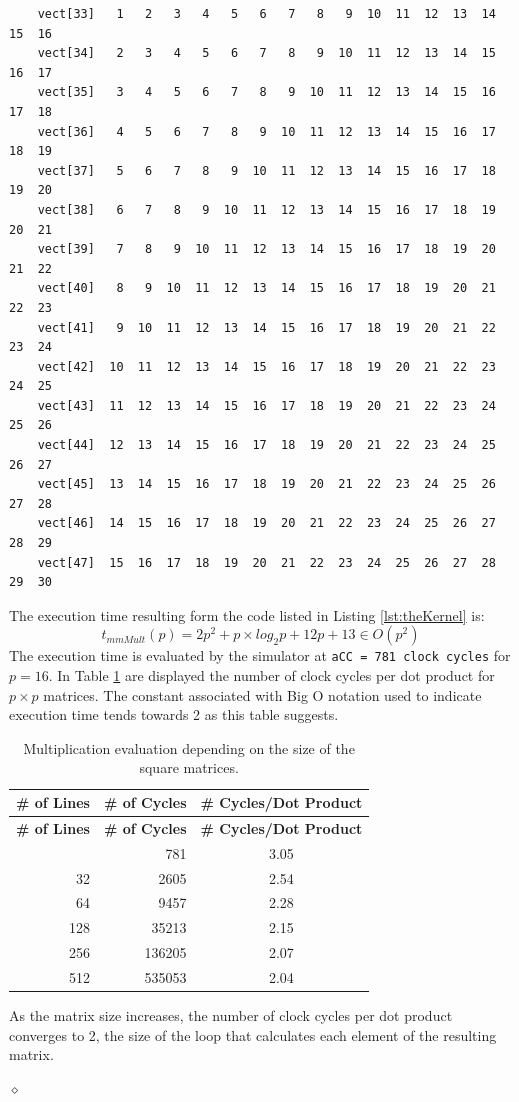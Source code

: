 \begin{exemplu}
{\begin{verbatim}
    vect[33]   1   2   3   4   5   6   7   8   9  10  11  12  13  14  15  16
    vect[34]   2   3   4   5   6   7   8   9  10  11  12  13  14  15  16  17
    vect[35]   3   4   5   6   7   8   9  10  11  12  13  14  15  16  17  18
    vect[36]   4   5   6   7   8   9  10  11  12  13  14  15  16  17  18  19
    vect[37]   5   6   7   8   9  10  11  12  13  14  15  16  17  18  19  20
    vect[38]   6   7   8   9  10  11  12  13  14  15  16  17  18  19  20  21
    vect[39]   7   8   9  10  11  12  13  14  15  16  17  18  19  20  21  22
    vect[40]   8   9  10  11  12  13  14  15  16  17  18  19  20  21  22  23
    vect[41]   9  10  11  12  13  14  15  16  17  18  19  20  21  22  23  24
    vect[42]  10  11  12  13  14  15  16  17  18  19  20  21  22  23  24  25
    vect[43]  11  12  13  14  15  16  17  18  19  20  21  22  23  24  25  26
    vect[44]  12  13  14  15  16  17  18  19  20  21  22  23  24  25  26  27
    vect[45]  13  14  15  16  17  18  19  20  21  22  23  24  25  26  27  28
    vect[46]  14  15  16  17  18  19  20  21  22  23  24  25  26  27  28  29
    vect[47]  15  16  17  18  19  20  21  22  23  24  25  26  27  28  29  30
\end{verbatim}
}

The execution time resulting form the code listed in Listing \ref{lst:theKernel} is: 
$$t_{mmMult}(p) = 2p^2 + p \times log_2 p +12p +13 \in O(p^2)$$
The execution time is evaluated by the simulator at {\tt aCC = 781 clock cycles} for $p = 16$. In Table \ref{tab:mmPerformance} are displayed the number of clock cycles per dot product for $p \times p$ matrices. The constant associated with Big O notation used to indicate execution time tends towards 2 as this table suggests.

{\small
{\centering
\begin{longtable}{|r|r|c|}
\caption{Multiplication evaluation depending on the size of the square matrices.}
\label{tab:mmPerformance} \\
\hline
\textbf{\# of Lines} & \textbf{\# of Cycles} & \textbf{\# Cycles/Dot Product} \\
\hline
\endfirsthead
\hline
\textbf{\# of Lines} & \textbf{\# of Cycles} & \textbf{\# Cycles/Dot Product} \\
\hline
\endhead
\hline
\endfoot
\hline
\endlastfoot
16  & 781     & 3.05 \\ \hline
32  & 2605    & 2.54 \\ \hline
64  & 9457    & 2.28 \\ \hline
128 & 35213   & 2.15 \\ \hline
256 & 136205  & 2.07 \\ \hline
512 & 535053  & 2.04 \\ \hline
\end{longtable}
}}

As the matrix size increases, the number of clock cycles per dot product converges to 2, the size of the loop that calculates each element of the resulting matrix.

$\diamond$
\end{exemplu}


